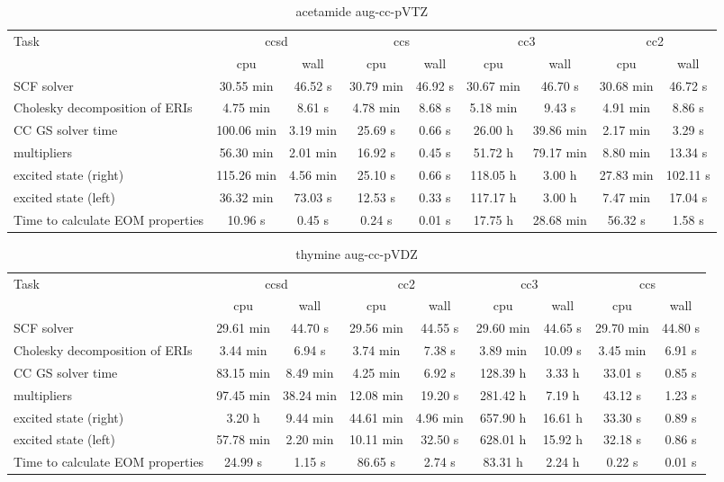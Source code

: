 \documentclass{article}
\begin{document}
\begin{table}
\caption{acetamide aug-cc-pVTZ}
\begin{tabular}{lcccccccc}
\toprule
Task & \multicolumn{2}{c}{ccsd} & \multicolumn{2}{c}{ccs} & \multicolumn{2}{c}{cc3} & \multicolumn{2}{c}{cc2}\\
\cmidrule(lr){2-3}\cmidrule(lr){4-5}\cmidrule(lr){6-7}\cmidrule(lr){8-9}
 & cpu & wall & cpu & wall & cpu & wall & cpu & wall\\
\midrule
SCF solver & 30.55 min & 46.52 s & 30.79 min & 46.92 s & 30.67 min & 46.70 s & 30.68 min & 46.72 s\\
Cholesky decomposition of ERIs & 4.75 min & 8.61 s & 4.78 min & 8.68 s & 5.18 min & 9.43 s & 4.91 min & 8.86 s\\
CC GS solver time & 100.06 min & 3.19 min & 25.69 s & 0.66 s & 26.00 h & 39.86 min & 2.17 min & 3.29 s\\
multipliers & 56.30 min & 2.01 min & 16.92 s & 0.45 s & 51.72 h & 79.17 min & 8.80 min & 13.34 s\\
excited state (right) & 115.26 min & 4.56 min & 25.10 s & 0.66 s & 118.05 h & 3.00 h & 27.83 min & 102.11 s\\
excited state (left) & 36.32 min & 73.03 s & 12.53 s & 0.33 s & 117.17 h & 3.00 h & 7.47 min & 17.04 s\\
Time to calculate EOM properties & 10.96 s & 0.45 s & 0.24 s & 0.01 s & 17.75 h & 28.68 min & 56.32 s & 1.58 s\\
\bottomrule
\end{tabular}
\end{table}
\begin{table}
\caption{thymine aug-cc-pVDZ}
\begin{tabular}{lcccccccc}
\toprule
Task & \multicolumn{2}{c}{ccsd} & \multicolumn{2}{c}{cc2} & \multicolumn{2}{c}{cc3} & \multicolumn{2}{c}{ccs}\\
\cmidrule(lr){2-3}\cmidrule(lr){4-5}\cmidrule(lr){6-7}\cmidrule(lr){8-9}
 & cpu & wall & cpu & wall & cpu & wall & cpu & wall\\
\midrule
SCF solver & 29.61 min & 44.70 s & 29.56 min & 44.55 s & 29.60 min & 44.65 s & 29.70 min & 44.80 s\\
Cholesky decomposition of ERIs & 3.44 min & 6.94 s & 3.74 min & 7.38 s & 3.89 min & 10.09 s & 3.45 min & 6.91 s\\
CC GS solver time & 83.15 min & 8.49 min & 4.25 min & 6.92 s & 128.39 h & 3.33 h & 33.01 s & 0.85 s\\
multipliers & 97.45 min & 38.24 min & 12.08 min & 19.20 s & 281.42 h & 7.19 h & 43.12 s & 1.23 s\\
excited state (right) & 3.20 h & 9.44 min & 44.61 min & 4.96 min & 657.90 h & 16.61 h & 33.30 s & 0.89 s\\
excited state (left) & 57.78 min & 2.20 min & 10.11 min & 32.50 s & 628.01 h & 15.92 h & 32.18 s & 0.86 s\\
Time to calculate EOM properties & 24.99 s & 1.15 s & 86.65 s & 2.74 s & 83.31 h & 2.24 h & 0.22 s & 0.01 s\\
\bottomrule
\end{tabular}
\end{table}
\end{document}
